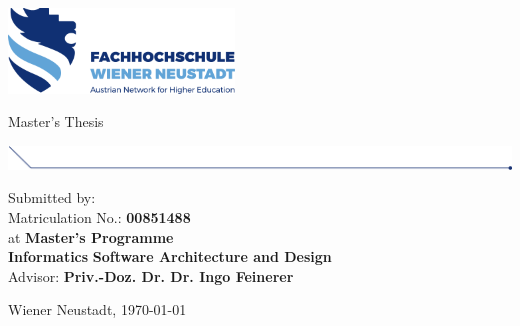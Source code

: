 
\makeatletter

\begin{titlepage}

  \includegraphics[width=6cm]{images/fhwn-logo.png}

  \vspace{70pt}
  {\noindent \linespread{1.3} \color{header-blue} \Huge \textbf{\@title} \par }
  \vspace{5pt}
  {\noindent\LARGE Master's Thesis \par}
  \vspace{20pt}

  \hspace{-35mm}
  \includegraphics[width=18.67cm]{images/titlepage-line.png}

  \vspace{15pt}

  \tabto{2cm}Submitted by: \tabto{7cm}\textbf{\@author} \\
  \tabto{2cm}Matriculation No.: \tabto{7cm}\textbf{00851488} \\
  \vspace{15pt}
  \tabto{2cm}at \tabto{7cm}\textbf{Master's Programme}\\
  \tabto{7cm}\textbf{Informatics}
  \tabto{7cm}\textbf{Software Architecture and Design} \\
  \vspace{15pt}
  \tabto{2cm}Advisor: \tabto{7cm}\textbf{Priv.-Doz. Dr. Dr. Ingo Feinerer}

  \vfill

  Wiener Neustadt, \today
      
\end{titlepage}
\makeatother

